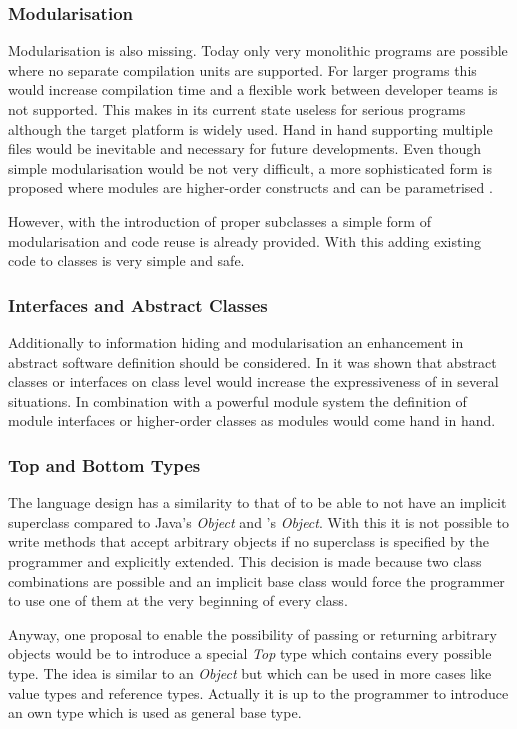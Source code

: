 \subsubsection{Modularisation}
Modularisation is also missing. Today only very monolithic programs
are possible where no separate compilation units are supported. For larger
programs this would increase compilation time and a flexible work between
developer teams is not supported. This makes \ooplss in its current state
useless for serious programs although the target platform is widely
used. Hand in hand supporting multiple files would be inevitable and
necessary for future developments. Even though simple modularisation would be
not very difficult, a more sophisticated form is proposed where modules are
higher-order constructs and can be parametrised \cite{dreyer_type_2003}.

However, with the introduction of proper subclasses a simple form of
modularisation and code reuse is already provided. With this adding
existing code to classes is very simple and safe.

\subsubsection{Interfaces and Abstract Classes}
Additionally to information hiding and modularisation an
enhancement in abstract software definition should be considered. In
 it was shown that abstract classes or
interfaces on class level would increase the expressiveness of \ooplss
in several situations. In combination with a powerful module system
the definition of module interfaces or higher-order classes as modules
would come hand in hand.

\subsubsection{Top and Bottom Types}
The language design has a similarity to that of \cpp to be able to not
have an implicit superclass compared to Java's \emph{Object} and \cs's
\emph {Object}. With this it is not possible to write methods that accept
arbitrary objects if no superclass is specified by the programmer and
explicitly extended. This decision is made because two class combinations
are possible and an implicit base class would force the programmer to
use one of them at the very beginning of every class.

Anyway, one proposal to enable the possibility of passing or returning
arbitrary objects would be to introduce a special \emph{Top} type which
contains every possible type. The idea is similar to an \emph{Object}
but which can be used in more cases like value types and reference
types. Actually it is up to the programmer to introduce an own type
which is used as general base type.


